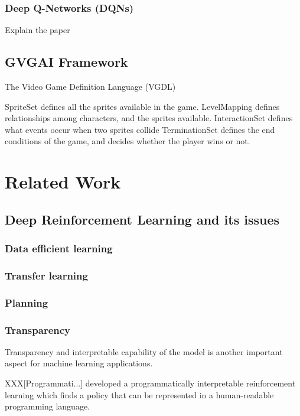 \documentclass[12pt,twoside]{report}
\begin{document}
\subsection{Deep Q-Networks (DQNs)}
\label{dqn}

Explain the paper
\section{GVGAI Framework}
\label{gvgai}

The Video Game Definition Language (VGDL)

SpriteSet defines all the sprites available in the game.
LevelMapping defines relationships among characters, and the sprites available.
InteractionSet defines what events occur when two sprites collide
TerminationSet defines the end conditions of the game, and decides whether the player wins or not.


\chapter{Related Work}

\section{Deep Reinforcement Learning and its issues}

\subsection{Data efficient learning}

\subsection{Transfer learning}

\subsection{Planning}

\subsection{Transparency}

Transparency and interpretable capability of the model is another important aspect for machine learning applications.


XXX[Programmati...] developed a programmatically interpretable reinforcement learning which finds a policy that can be represented in a human-readable programming language.
\end{document}
